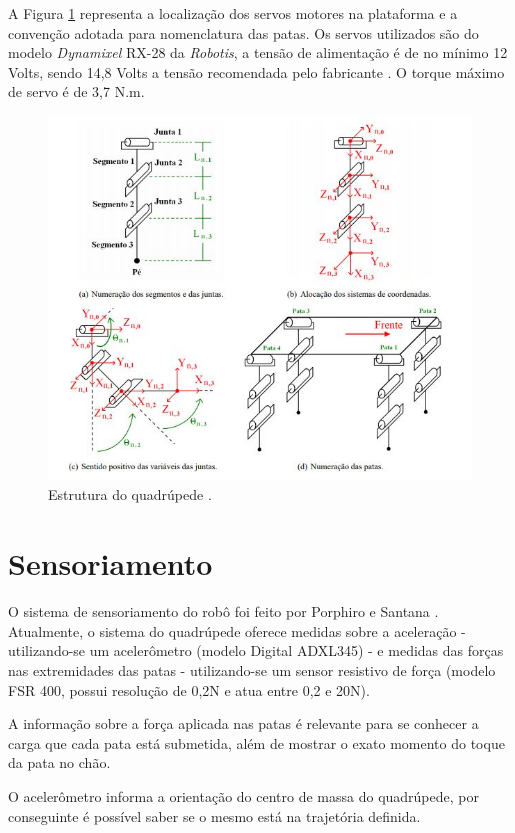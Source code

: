\documentclass[12pt]{report}
\begin{document}
A Figura \ref{estrutura} representa a localização dos servos motores na plataforma e a convenção adotada para nomenclatura das patas. Os servos utilizados são do modelo \textit{Dynamixel} RX-28 da \textit{Robotis}, a tensão de alimentação é de no mínimo 12 Volts, sendo 14,8 Volts a tensão recomendada pelo fabricante  \cite{8}. O torque máximo de servo é de 3,7 N.m.

\begin{figure}[ht!]
	\captionsetup{justification=centering}
	\centering
	\includegraphics[width=0.7\linewidth]{imagens/fundamentos/cordpatas.JPG}
	\caption{Estrutura do quadrúpede \cite{9}.}
	\label{estrutura}
\end{figure}

\section*{Sensoriamento}

O sistema de sensoriamento do robô foi feito por Porphiro e Santana \cite{10}. Atualmente, o sistema do quadrúpede oferece medidas sobre a aceleração - utilizando-se um acelerômetro (modelo Digital ADXL345) - e medidas das forças nas extremidades das patas - utilizando-se um sensor resistivo de força (modelo FSR 400, possui resolução de 0,2N e atua entre 0,2 e 20N).

A informação sobre a força aplicada nas patas é relevante para se conhecer a carga que cada pata está submetida, além de mostrar o exato momento do toque da pata no chão.

O acelerômetro informa a orientação do centro de massa do quadrúpede, por conseguinte é possível saber se o mesmo está na trajetória definida. %
\end{document}
